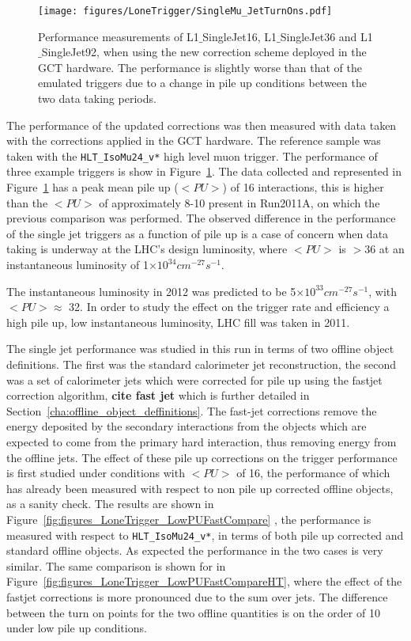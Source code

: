 \begin{figure}[htbp]
  \centering
    \texttt{[image: figures/LoneTrigger/SingleMu\_JetTurnOns.pdf]}
  \caption{Performance measurements of L1$\_$SingleJet16, L1$\_$SingleJet36 and L1$\_$SingleJet92, when using the new correction scheme deployed in the GCT hardware. The performance is slightly worse than that of the emulated triggers due to a change in pile up conditions between the two data taking periods.}
  \label{fig:figures_LoneTrigger_SingleMu_JetTurnOns}
\end{figure}

The performance of the updated corrections was then measured with data taken 
with the corrections applied in the GCT hardware. The reference sample was 
taken with the  \verb|HLT_IsoMu24_v*| high level muon trigger.
The performance of three example triggers is show in 
Figure~\ref{fig:figures_LoneTrigger_SingleMu_JetTurnOns}.
The data collected and represented in 
Figure~\ref{fig:figures_LoneTrigger_SingleMu_JetTurnOns} has a peak mean pile 
up ($<PU>$) of 16 interactions, this is higher than the $<PU>$ of approximately 
8-10 present in Run2011A, on which the previous comparison was performed.
The observed difference in the performance of the \Lone single jet triggers as 
a function of pile up is a case of concern when data taking is underway at the 
LHC's design luminosity, where $<PU>$ is $>$36 at an instantaneous luminosity 
of 1$\times 10 ^{34} cm^{-27}s^{-1}$.

The instantaneous luminosity in 2012 was predicted to be 5$\times 10 ^{33} 
cm^{-27}s^{-1}$, with $<PU> \approx$ 32. In order to study the effect on the 
trigger rate and efficiency a high pile up, low instantaneous luminosity, LHC 
fill was taken in 2011.

The \Lone single jet performance was studied in this run in terms of two 
offline object definitions. The first was the standard \AK calorimeter jet 
reconstruction, the second was a set of \AK calorimeter jets which were 
corrected for pile up using the fastjet correction algorithm, \textbf{cite fast 
jet} which is further detailed in Section~\ref{cha:offline_object_deffinitions}.
The fast-jet corrections remove the energy deposited by the secondary 
interactions from the objects which are expected to come from the primary hard 
interaction, thus removing energy from the offline jets.
The effect of these pile up corrections on the \Lone trigger performance is 
first studied under conditions with $<PU>$ of 16, the performance of which has 
already been measured with respect to non pile up corrected offline objects, as 
a sanity check. The results are shown in 
Figure~\ref{fig:figures_LoneTrigger_LowPUFastCompare} , the performance is 
measured with respect to \verb|HLT_IsoMu24_v*|, in terms of both pile up 
corrected and standard offline objects. As expected the performance in the two 
cases is very similar. The same comparison is shown for \HT in 
Figure~\ref{fig:figures_LoneTrigger_LowPUFastCompareHT}, where the effect of 
the fastjet corrections is more pronounced due to the sum over jets.
The difference between the turn on points for the two offline quantities is on 
the order of \unit{10}{\GeV} under low pile up conditions.

